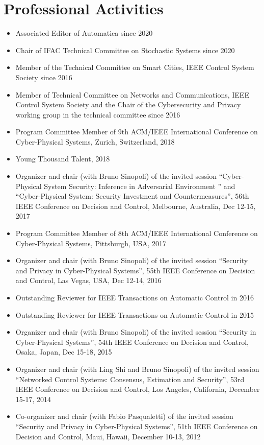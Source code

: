 \documentclass[10pt, a4paper]{article}
\begin{document}
\section*{Professional Activities}
\begin{itemize}
\item Associated Editor of Automatica since 2020

\item Chair of IFAC Technical Committee on Stochastic Systems since 2020

\item Member of the Technical Committee on Smart Cities, IEEE Control System Society since 2016

\item Member of Technical Committee on Networks and Communications, IEEE Control System Society and the Chair of the Cybersecurity and Privacy working group in the technical committee since 2016

\item Program Committee Member of 9th ACM/IEEE International Conference on Cyber-Physical Systems, Zurich, Switzerland, 2018

\item Young Thousand Talent, 2018

\item Organizer and chair (with Bruno Sinopoli) of the invited session “Cyber-Physical System Security: Inference in Adversarial Environment
” and “Cyber-Physical System: Security Investment and Countermeasures”, 56th IEEE Conference on Decision and Control, Melbourne, Australia, Dec 12-15, 2017

\item Program Committee Member of 8th ACM/IEEE International Conference on Cyber-Physical Systems, Pittsburgh, USA, 2017

\item Organizer and chair (with Bruno Sinopoli) of the invited session “Security and Privacy in Cyber-Physical Systems”, 55th IEEE Conference on Decision and Control, Las Vegas, USA, Dec 12-14, 2016

\item Outstanding Reviewer for IEEE Transactions on Automatic Control in 2016

\item Outstanding Reviewer for IEEE Transactions on Automatic Control in 2015

\item Organizer and chair (with Bruno Sinopoli) of the invited session “Security in Cyber-Physical Systems”, 54th IEEE Conference on Decision and Control, Osaka, Japan, Dec 15-18, 2015

\item Organizer and chair (with Ling Shi and Bruno Sinopoli) of the invited session “Networked Control Systems: Consensus, Estimation and Security”, 53rd IEEE Conference on Decision and Control, Los Angeles, California, December 15-17, 2014
%
\item Co-organizer and chair (with Fabio Pasqualetti) of the invited session ``Security and Privacy in Cyber-Physical Systems'', 51th IEEE Conference on Decision and Control, Maui, Hawaii, December 10-13, 2012
%
\end{itemize}
\end{document}
